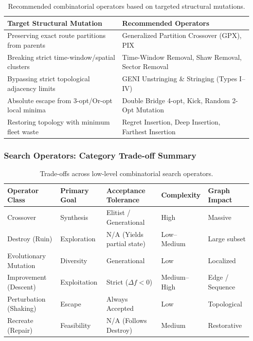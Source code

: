 \documentclass{article}
\begin{document}
\begin{table}[H]
    \centering
    \caption{Recommended combinatorial operators based on targeted structural mutations.}
    \begin{tabularx}{\textwidth}{@{} l X @{}}
        \toprule
        \textbf{Target Structural Mutation} & \textbf{Recommended Operators} \\
        \midrule
        Preserving exact route partitions from parents & Generalized Partition Crossover (GPX), PIX \\
        Breaking strict time-window/spatial clusters & Time-Window Removal, Shaw Removal, Sector Removal \\
        Bypassing strict topological adjacency limits & GENI Unstringing \& Stringing (Types I--IV) \\
        Absolute escape from 3-opt/Or-opt local minima & Double Bridge 4-opt, Kick, Random 2-Opt Mutation \\
        Restoring topology with minimum fleet waste & Regret Insertion, Deep Insertion, Farthest Insertion \\
        \bottomrule
    \end{tabularx}
\end{table}

\subsubsection*{Search Operators: Category Trade-off Summary}

\begin{table}[H]
    \centering
    \caption{Trade-offs across low-level combinatorial search operators.}
    \begin{tabularx}{\textwidth}{@{} X l l l X @{}}
        \toprule
        \textbf{Operator Class} & \textbf{Primary Goal} & \textbf{Acceptance Tolerance} & \textbf{Complexity} & \textbf{Graph Impact} \\
        \midrule
        Crossover & Synthesis & Elitist / Generational & High & Massive \\
        Destroy (Ruin) & Exploration & N/A (Yields partial state) & Low--Medium & Large subset \\
        Evolutionary Mutation & Diversity & Generational & Low & Localized \\
        Improvement (Descent) & Exploitation & Strict ($\Delta f < 0$) & Medium--High & Edge / Sequence \\
        Perturbation (Shaking) & Escape & Always Accepted & Low & Topological \\
        Recreate (Repair) & Feasibility & N/A (Follows Destroy) & Medium & Restorative \\
        \bottomrule
    \end{tabularx}
\end{table}
\end{document}
